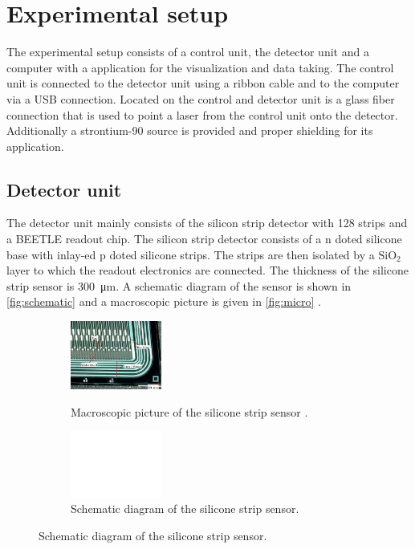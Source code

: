 \section{Experimental setup}
The experimental setup consists of a control unit, the detector unit and a computer with a application for the visualization and data taking. The control unit is connected to the detector unit using a ribbon cable and to the computer via a USB connection. Located on the control and detector unit is a glass fiber connection that is used to point a laser from the control unit onto the detector. Additionally a strontium-90 source is provided and proper shielding for its application.

\subsection{Detector unit}
The detector unit mainly consists of the silicon strip detector with 128 strips and a BEETLE readout chip. The silicon strip detector consists of a n doted silicone base with inlay-ed p doted silicone strips. The strips are then isolated by a $\mathrm{SiO}_2$ layer to which the readout electronics are connected. The thickness of the silicone strip sensor is \qty{300}{\micro\meter}. A schematic diagram of the sensor is shown in \autoref{fig:schematic} and a macroscopic picture is given in \autoref{fig:micro} \cite{V15}. 



\begin{figure}[H]
	\centering
	\begin{subfigure}{0.45\textwidth}
		\includegraphics[width=3cm]{Assets/micro}
		\label{fig:micro}
		\caption{Macroscopic picture of the silicone strip sensor \cite{V15}.}
	\end{subfigure}
	\hfill
	\begin{subfigure}{0.45\textwidth}
		\includegraphics[width=3cm]{Assets/schematic}
		\caption{Schematic diagram of the silicone strip sensor\cite{V15}.}
		\label{fig:schematic}
	\end{subfigure}
\end{figure}


